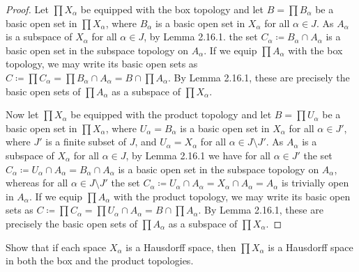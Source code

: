 \begin{solution}
    \begin{proof}
        Let $\prod X_\alpha$ be equipped with the box topology and let $B = \prod B_\alpha$ be a basic open set in $\prod X_\alpha$, where $B_\alpha$ is a basic open set in $X_\alpha$ for all $\alpha \in J$.
        As $A_\alpha$ is a subspace of $X_\alpha$ for all $\alpha \in J$, by Lemma 2.16.1. the set $C_\alpha \coloneq B_\alpha \cap A_\alpha$ is a basic open set in the subspace topology on $A_\alpha$.
        If we equip $\prod A_\alpha$ with the box topology, we may write its basic open sets as $C \coloneq \prod C_\alpha = \prod B_\alpha \cap A_\alpha = B \cap \prod A_\alpha$.
        By Lemma 2.16.1, these are precisely the basic open sets of $\prod A_\alpha$ as a subspace of $\prod X_\alpha$.

        Now let $\prod X_\alpha$ be equipped with the product topology and let $B = \prod U_\alpha$ be a basic open set in $\prod X_\alpha$, where $U_\alpha = B_\alpha$ is a basic open set in $X_\alpha$ for all $\alpha \in J'$, where $J'$ is a finite subset of $J$, and $U_\alpha = X_\alpha$ for all $\alpha \in J \setminus J'$.
        As $A_\alpha$ is a subspace of $X_\alpha$ for all $\alpha \in J$, by Lemma 2.16.1 we have for all $\alpha \in J'$ the set $C_\alpha \coloneq U_\alpha \cap A_\alpha = B_\alpha  \cap A_\alpha$ is a basic open set in the subspace topology on $A_\alpha$, whereas for all $\alpha \in J \setminus J'$ the set $C_\alpha \coloneq U_\alpha \cap A_\alpha = X_\alpha \cap A_\alpha = A_\alpha$ is trivially open in $A_\alpha$.
        If we equip $\prod A_\alpha$ with the product topology, we may write its basic open sets as $C \coloneq \prod C_\alpha = \prod U_\alpha \cap A_\alpha = B \cap \prod A_\alpha$.
        By Lemma 2.16.1, these are precisely the basic open sets of $\prod A_\alpha$ as a subspace of $\prod X_\alpha$.
    \end{proof}
\end{solution}
\newpage

\begin{exercise}[ID=2.19.3]
    Show that if each space $X_\alpha$ is a Hausdorff space, then $\prod X_\alpha$ is a Hausdorff space in both the box and the product topologies.
\end{exercise}

